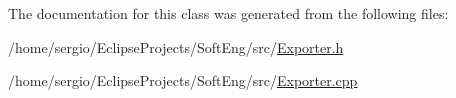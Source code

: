 The documentation for this class was generated from the following files\+:\begin{DoxyCompactItemize}
\item 
/home/sergio/\+Eclipse\+Projects/\+Soft\+Eng/src/\hyperlink{_exporter_8h}{Exporter.\+h}\item 
/home/sergio/\+Eclipse\+Projects/\+Soft\+Eng/src/\hyperlink{_exporter_8cpp}{Exporter.\+cpp}\end{DoxyCompactItemize}
